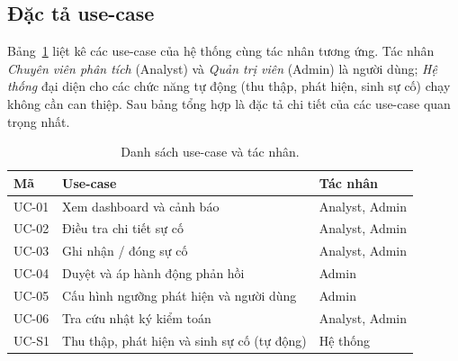 \subsection{Đặc tả use-case}
\label{subsec:uc-spec}

Bảng~\ref{tab:uc-list} liệt kê các use-case của hệ thống cùng tác nhân tương ứng. Tác
nhân \emph{Chuyên viên phân tích} (Analyst) và \emph{Quản trị viên} (Admin) là người dùng;
\emph{Hệ thống} đại diện cho các chức năng tự động (thu thập, phát hiện, sinh sự cố) chạy
không cần can thiệp. Sau bảng tổng hợp là đặc tả chi tiết của các use-case quan trọng nhất.

\begin{table}[H]
  \centering
  \caption{Danh sách use-case và tác nhân.}
  \label{tab:uc-list}
  \small
  \begin{tabularx}{\linewidth}{@{}l X l@{}}
    \toprule
    \textbf{Mã} & \textbf{Use-case} & \textbf{Tác nhân} \\
    \midrule
    UC-01 & Xem dashboard và cảnh báo            & Analyst, Admin \\
    UC-02 & Điều tra chi tiết sự cố              & Analyst, Admin \\
    UC-03 & Ghi nhận / đóng sự cố                & Analyst, Admin \\
    UC-04 & Duyệt và áp hành động phản hồi       & Admin \\
    UC-05 & Cấu hình ngưỡng phát hiện và người dùng & Admin \\
    UC-06 & Tra cứu nhật ký kiểm toán            & Analyst, Admin \\
    UC-S1 & Thu thập, phát hiện và sinh sự cố (tự động) & Hệ thống \\
    \bottomrule
  \end{tabularx}
\end{table}

